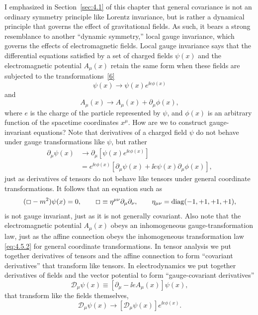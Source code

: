 I emphasized in Section~\ref{sec:4.1} of this chapter that general covariance
is not an ordinary symmetry principle like Lorentz invariance, but is rather
a dynamical principle that governs the effect of gravitational fields. As
such, it bears a strong resemblance to another ``dynamic symmetry,'' local
gauge invariance, which governs the effects of electromagnetic fields. Local
gauge invariance says that the differential equations satisfied by a set of
charged fields \(\psi(x)\) and the electromagnetic potential \(A_\mu(x)\)
retain the same form when these fields are subjected to the
transformations~\hyperref[ch4-ref-6]{[6]}
\begin{equation}
  \psi(x)
  \longrightarrow
  \psi(x)e^{\ii e\phi(x)}
  \tag{4.10.1}\label{eq:4.10.1}
\end{equation}
and
\begin{equation}
  A_\mu(x)
  \longrightarrow
  A_\mu(x)+\partial_\mu\phi(x),
  \tag{4.10.2}\label{eq:4.10.2}
\end{equation}
where \(e\) is the charge of the particle represented by \(\psi\), and
\(\phi(x)\) is an arbitrary function of the spacetime coordinates \(x^\mu\).
How are we to construct gauge-invariant equations? Note that derivatives of
a charged field \(\psi\) do not behave under gauge transformations like
\(\psi\), but rather
\begin{align*}
  \partial_\mu\psi(x)
  &\longrightarrow
  \partial_\mu\!\left[\psi(x)e^{\ii e\phi(x)}\right]
  \\
  &=
  e^{\ii e\phi(x)}
  \left[
    \partial_\mu\psi(x)
    +\ii e\psi(x)\partial_\mu\phi(x)
  \right],
\end{align*}
just as derivatives of tensors do not behave like tensors under general
coordinate transformations. It follows that an equation such as
\[
  (\Box-m^2)\psi(x)=0,
  \qquad
  \Box\equiv\eta^{\mu\nu}\partial_\mu\partial_\nu,
  \qquad
  \eta_{\mu\nu}=\operatorname{diag}(-1,+1,+1,+1),
\]
is not gauge invariant, just as it is not generally covariant. Also note
that the electromagnetic potential \(A_\mu(x)\) obeys an inhomogeneous
gauge-transformation law, just as the affine connection obeys the
inhomogeneous transformation law \eqref{eq:4.5.2} for general coordinate
transformations. In tensor analysis we put together derivatives of tensors
and the affine connection to form ``covariant derivatives'' that transform
like tensors. In electrodynamics we put together derivatives of fields and
the vector potential to form ``gauge-covariant derivatives''
\begin{equation}
  \mathcal D_\mu\psi(x)
  \equiv
  \left[\partial_\mu-\ii eA_\mu(x)\right]\psi(x),
  \tag{4.10.3}\label{eq:4.10.3}
\end{equation}
that transform like the fields themselves,
\begin{equation}
  \mathcal D_\mu\psi(x)
  \longrightarrow
  \left[\mathcal D_\mu\psi(x)\right]e^{\ii e\phi(x)}.
  \tag{4.10.4}\label{eq:4.10.4}
\end{equation}

